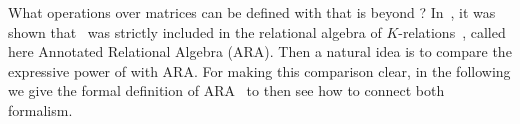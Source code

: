 %
%
%

What operations over matrices can be defined with \langsum that is beyond \lang? In~\cite{brijder2019matrices}, it was shown that \lang\ was strictly included in the relational algebra of $K$-relations~\cite{GreenKT07}, called here Annotated Relational Algebra (ARA).
Then a natural idea is to compare the expressive power of \langsum with ARA. For making this comparison clear, in the following we give the formal definition of ARA~\cite{GreenKT07} to then see how to connect both formalism.

\newcommand{\ddom}{\mathbb{D}}
\newcommand{\fdom}{\operatorname{dom}}
\newcommand{\att}{\mathbb{A}}
\newcommand{\tuples}{\mathbf{tuples}}
\newcommand{\supp}{\operatorname{supp}}
\newcommand{\cJ}{\mathcal{J}}
\newcommand{\cR}{\mathcal{R}}
\newcommand{\adom}{\mathbf{adom}}

